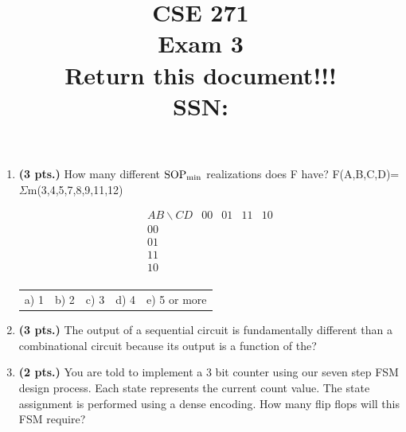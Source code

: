 \documentclass{article}
\begin{document}
\newcommand{\SOPmin}{${\rm SOP}_{\rm min} \ $}
\newcommand{\POSmin}{${\rm POS}_{\rm min} \ $}
\newcommand{\bs}{\backslash}
\newcommand{\x}{\addtocounter{enumi}{1} \theenumi}


\title{
\Huge{CSE 271}\\
\normalsize{Exam 3}\\
\normalsize{Return this document!!!}\\
SSN:}
\date{}

\maketitle{}

\begin{enumerate}
\item {\bf (3 pts.)} How many different \SOPmin realizations does F have?
F(A,B,C,D)=$\Sigma$m(3,4,5,7,8,9,11,12)

$$ \begin{array} {c||c|c|c|c}
        AB \bs CD & 00 & 01 & 11 & 10 \\ \hline \hline
        00        &    &    &    &    \\ \hline
        01        &    &    &    &    \\ \hline
        11        &    &    &    &    \\ \hline
        10        &    &    &    &    \\
\end{array} $$ 

\begin{tabular}{p{0.75in}p{0.75in}p{0.75in}p{0.75in}p{0.75in}}
a) 1 & b) 2 & c) 3 & d) 4 & e) 5 or more \\
\end{tabular}

\item {\bf (3 pts.)} The output of a sequential circuit is fundamentally
different than a combinational circuit because its output is a function
of the?

\item {\bf (2 pts.)} You are told to implement a 3 bit counter using our seven
step FSM design process.  Each state represents the current count value.  The
state assignment is performed using a dense encoding. 
How many flip flops will this FSM require?


\end{enumerate}
\end{document}
